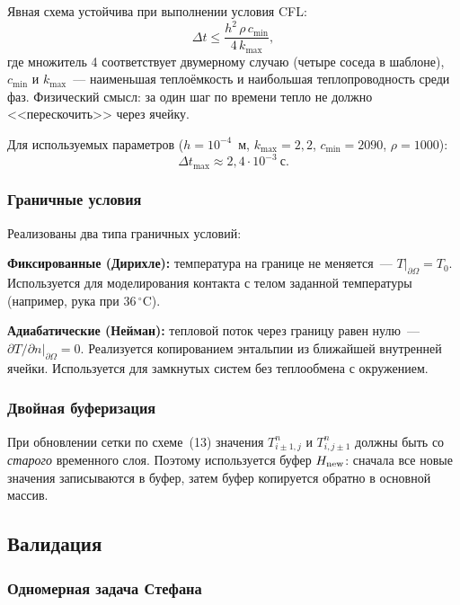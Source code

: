 Явная схема устойчива при выполнении условия CFL:
\begin{equation}\label{eq:cfl}
  \Delta t \le \frac{h^2\,\rho\,c_{\min}}{4\,k_{\max}},
\end{equation}
где множитель 4 соответствует двумерному случаю (четыре соседа в шаблоне),
$c_{\min}$ и $k_{\max}$~--- наименьшая теплоёмкость и наибольшая
теплопроводность среди фаз. Физический смысл: за один шаг по времени
тепло не должно <<перескочить>> через ячейку.

Для используемых параметров ($h = 10^{-4}$~м, $k_{\max} = 2{,}2$,
$c_{\min} = 2090$, $\rho = 1000$):
\[
  \Delta t_{\max} \approx 2{,}4 \cdot 10^{-3}~\text{с}.
\]

\subsubsection{Граничные условия}

Реализованы два типа граничных условий:

\textbf{Фиксированные (Дирихле):}
температура на границе не меняется~--- $T|_{\partial\Omega} = T_0$.
Используется для моделирования контакта с телом заданной температуры
(например, рука при $36\,^{\circ}$C).

\textbf{Адиабатические (Нейман):}
тепловой поток через границу равен нулю~---
$\partial T / \partial n|_{\partial\Omega} = 0$.
Реализуется копированием энтальпии из ближайшей внутренней ячейки.
Используется для замкнутых систем без теплообмена с окружением.

\subsubsection{Двойная буферизация}

При обновлении сетки по схеме~(13) значения $T_{i\pm1,j}^n$
и $T_{i,j\pm1}^n$ должны быть со \textit{старого} временного слоя.
Поэтому используется буфер $H_{\rm new}$: сначала все новые значения
записываются в буфер, затем буфер копируется обратно в основной массив.

\subsection{Валидация}

\subsubsection{Одномерная задача Стефана}

